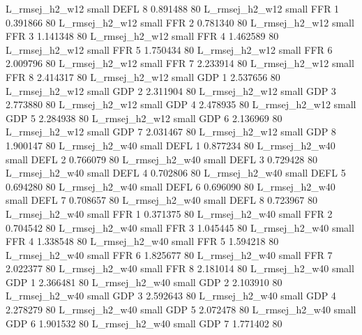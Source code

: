 L_rmsej_h2_w12      small     DEFL                 8 0.891488 80
L_rmsej_h2_w12      small      FFR                 1 0.391866 80
L_rmsej_h2_w12      small      FFR                 2 0.781340 80
L_rmsej_h2_w12      small      FFR                 3 1.141348 80
L_rmsej_h2_w12      small      FFR                 4 1.462589 80
L_rmsej_h2_w12      small      FFR                 5 1.750434 80
L_rmsej_h2_w12      small      FFR                 6 2.009796 80
L_rmsej_h2_w12      small      FFR                 7 2.233914 80
L_rmsej_h2_w12      small      FFR                 8 2.414317 80
L_rmsej_h2_w12      small      GDP                 1 2.537656 80
L_rmsej_h2_w12      small      GDP                 2 2.311904 80
L_rmsej_h2_w12      small      GDP                 3 2.773880 80
L_rmsej_h2_w12      small      GDP                 4 2.478935 80
L_rmsej_h2_w12      small      GDP                 5 2.284938 80
L_rmsej_h2_w12      small      GDP                 6 2.136969 80
L_rmsej_h2_w12      small      GDP                 7 2.031467 80
L_rmsej_h2_w12      small      GDP                 8 1.900147 80
L_rmsej_h2_w40      small     DEFL                 1 0.877234 80
L_rmsej_h2_w40      small     DEFL                 2 0.766079 80
L_rmsej_h2_w40      small     DEFL                 3 0.729428 80
L_rmsej_h2_w40      small     DEFL                 4 0.702806 80
L_rmsej_h2_w40      small     DEFL                 5 0.694280 80
L_rmsej_h2_w40      small     DEFL                 6 0.696090 80
L_rmsej_h2_w40      small     DEFL                 7 0.708657 80
L_rmsej_h2_w40      small     DEFL                 8 0.723967 80
L_rmsej_h2_w40      small      FFR                 1 0.371375 80
L_rmsej_h2_w40      small      FFR                 2 0.704542 80
L_rmsej_h2_w40      small      FFR                 3 1.045445 80
L_rmsej_h2_w40      small      FFR                 4 1.338548 80
L_rmsej_h2_w40      small      FFR                 5 1.594218 80
L_rmsej_h2_w40      small      FFR                 6 1.825677 80
L_rmsej_h2_w40      small      FFR                 7 2.022377 80
L_rmsej_h2_w40      small      FFR                 8 2.181014 80
L_rmsej_h2_w40      small      GDP                 1 2.366481 80
L_rmsej_h2_w40      small      GDP                 2 2.103910 80
L_rmsej_h2_w40      small      GDP                 3 2.592643 80
L_rmsej_h2_w40      small      GDP                 4 2.278279 80
L_rmsej_h2_w40      small      GDP                 5 2.072478 80
L_rmsej_h2_w40      small      GDP                 6 1.901532 80
L_rmsej_h2_w40      small      GDP                 7 1.771402 80
